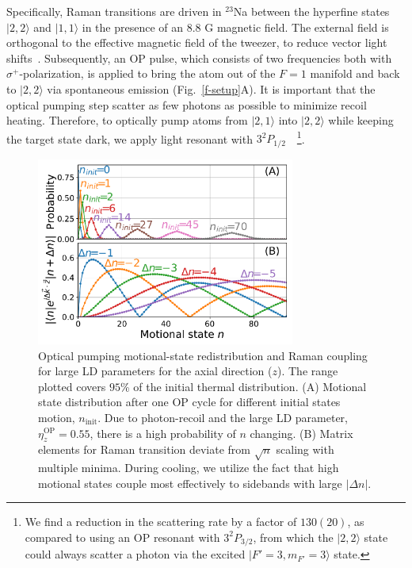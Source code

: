\documentclass[aps,prl,twocolumn,groupedaddress]{revtex4-1}
\begin{document}
Specifically, Raman transitions are driven in $^{23}$Na between the hyperfine states
$|2, 2\rangle$ and $|1, 1\rangle$ in the presence of an $8.8$ G magnetic field.
The external field is orthogonal to the effective magnetic field of the tweezer,
to reduce vector light shifts~\cite{Kaufman2012,Thompson2013}.
Subsequently, an OP pulse, which consists of two frequencies both with $\sigma^+$-polarization,
is applied to bring the atom out of the $F=1$ manifold and back to $|2, 2\rangle$
via spontaneous emission (Fig.~\ref{f-setup}A).
It is important that the optical pumping step scatter as few photons as possible to minimize recoil heating.
Therefore, to optically pump atoms from $|2, 1\rangle$ into $|2, 2\rangle$
while keeping the target state dark, we apply light resonant with $3^2P_{1/2}$~\cite{Monroe1995, Grobner2017}~\footnote{We find a reduction in the scattering rate by a factor of $130(20)$, as compared to using an OP resonant with $3^2P_{3/2}$, from which the $|2, 2\rangle$ state could always scatter a photon via the excited $|F'=3, m_{F'}=3\rangle$ state.}.

\begin{figure}[b]
  \includegraphics[width=8.5cm]{fig2_raman_op.pdf}
  \caption{Optical pumping motional-state redistribution and Raman coupling for large LD parameters for the axial direction ($z$). The range plotted covers $95$\% of the initial thermal distribution.
    (A) Motional state distribution after one OP cycle for different initial states motion,
    $n_{\textrm{init}}$. Due to photon-recoil and the large LD parameter, $\eta^{\textrm{OP}}_z=0.55$,
    there is a high probability of $n$ changing.
    (B) Matrix elements for Raman transition deviate from
    $\sqrt{n}$ scaling with multiple minima. During cooling, we utilize the fact that high motional states couple most effectively to sidebands with large $|\Delta n|$.
    \label{f-ld}}
\end{figure}
\end{document}
